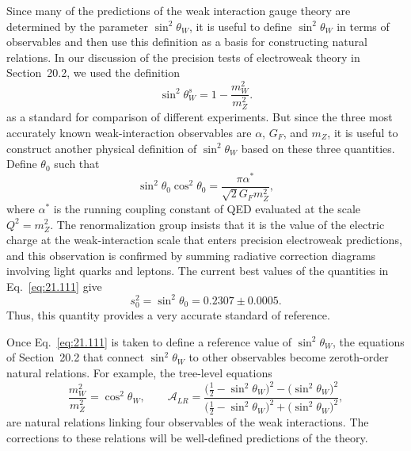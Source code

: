 Since many of the predictions of the weak interaction gauge theory are
determined by the parameter $\sin^2\theta_W$, it is useful to define
$\sin^2\theta_W$ in terms of observables and then use this definition as a
basis for constructing natural relations.  In our discussion of the precision
tests of electroweak theory in Section~20.2, we used the definition
\begin{equation}
  \sin^2\theta^s_W = 1 - \frac{m_W^2}{m_Z^2} .
  \label{eq:21.110}
\end{equation}
as a standard for comparison of different experiments.  But since the three
most accurately known weak-interaction observables are $\alpha$, $G_F$, and
$m_Z$, it is useful to construct another physical definition of
$\sin^2\theta_W$ based on these three quantities.  Define $\theta_0$ such
that
\begin{equation}
  \sin^2\theta_0\cos^2\theta_0 = \frac{\pi\alpha^{*}}{\sqrt{2}G_Fm_Z^2} ,
  \label{eq:21.111}
\end{equation}
where $\alpha^{*}$ is the running coupling constant of QED evaluated at the
scale $Q^2 = m_Z^2$.  The renormalization group insists that it is the value
of the electric charge at the weak-interaction scale that enters precision
electroweak predictions, and this observation is confirmed by summing
radiative correction diagrams involving light quarks and leptons.  The
current best values of the quantities in Eq.~\eqref{eq:21.111} give
\begin{equation}
  s^2_0 = \sin^2\theta_0 = 0.2307 \pm 0.0005 .
  \label{eq:21.112}
\end{equation}
Thus, this quantity provides a very accurate standard of reference.

Once Eq.~\eqref{eq:21.111} is taken to define a reference value of
$\sin^2\theta_W$, the equations of Section~20.2 that connect
$\sin^2\theta_W$ to other observables become zeroth-order natural relations.
For example, the tree-level equations
\begin{equation}
  \frac{m_W^2}{m_Z^2} = \cos^2\theta_W,\qquad
  \mathcal{A}_{LR} = \frac{\bigl( \tfrac{1}{2} - \sin^2\theta_W \bigr)^2
    - \bigl( \sin^2\theta_W \bigr)^2}
    {\bigl( \tfrac{1}{2} - \sin^2\theta_W \bigr)^2
    + \bigl( \sin^2\theta_W \bigr)^2} ,
  \label{eq:21.113}
\end{equation}
are natural relations linking four observables of the weak interactions.
The corrections to these relations will be well-defined predictions of the
theory.

